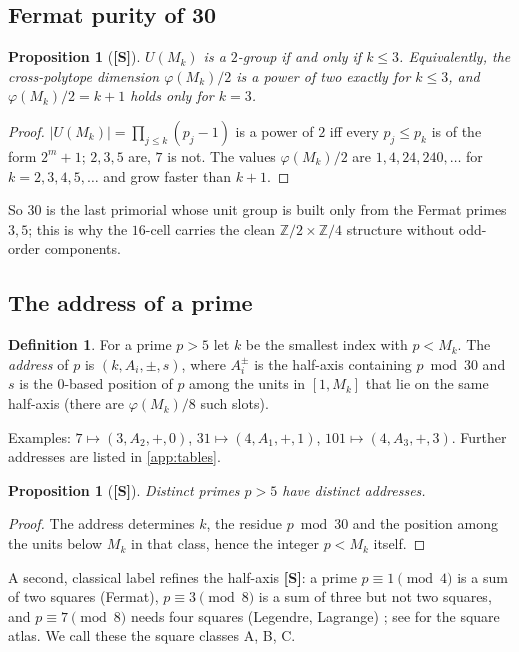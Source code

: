 \documentclass[11pt,a4paper]{article}
\newcommand{\statS}{\textsf{\textbf{[S]}}}
\theoremstyle{plain}
\newtheorem{proposition}[theorem]{Proposition}
\theoremstyle{definition}
\newtheorem{definition}[theorem]{Definition}
\theoremstyle{remark}
\newcommand{\Z}{\mathbb{Z}}
\begin{document}
\subsection{Fermat purity of 30}
\begin{proposition}[\statS]\label{prop:fermatpure}
$U(M_k)$ is a $2$-group if and only if $k\le3$. Equivalently, the
cross-polytope dimension $\varphi(M_k)/2$ is a power of two exactly for
$k\le3$, and $\varphi(M_k)/2=k+1$ holds only for $k=3$.
\end{proposition}
\begin{proof}
$|U(M_k)|=\prod_{j\le k}(p_j-1)$ is a power of $2$ iff every $p_j\le p_k$ is
of the form $2^m+1$; $2,3,5$ are, $7$ is not. The values $\varphi(M_k)/2$ are
$1,4,24,240,\dots$ for $k=2,3,4,5,\dots$ and grow faster than $k+1$.
\end{proof}
So $30$ is the last primorial whose unit group is built only from the Fermat
primes $3,5$; this is why the $16$-cell carries the clean $\Z/2\times\Z/4$
structure without odd-order components.

\subsection{The address of a prime}
\begin{definition}\label{def:address}
For a prime $p>5$ let $k$ be the smallest index with $p<M_k$. The
\emph{address} of $p$ is $(k,A_i,\pm,s)$, where $A_i^\pm$ is the half-axis
containing $p\bmod30$ and $s$ is the $0$-based position of $p$ among the
units in $[1,M_k]$ that lie on the same half-axis (there are $\varphi(M_k)/8$
such slots).
\end{definition}
Examples: $7\mapsto(3,A_2,+,0)$, $31\mapsto(4,A_1,+,1)$,
$101\mapsto(4,A_3,+,3)$. Further addresses are listed in \cref{app:tables}.
\begin{proposition}[\statS]
Distinct primes $p>5$ have distinct addresses.
\end{proposition}
\begin{proof}
The address determines $k$, the residue $p\bmod 30$ and the position among the
units below $M_k$ in that class, hence the integer $p<M_k$ itself.
\end{proof}
A second, classical label refines the half-axis \statS: a prime
$p\equiv1\pmod4$ is a sum of two squares (Fermat), $p\equiv3\pmod8$ is a sum
of three but not two squares, and $p\equiv7\pmod8$ needs four squares
(Legendre, Lagrange) \cite{HardyWright}; see \cite{K-triangle} for the square atlas. We call these the square classes
A, B, C.
\end{document}
